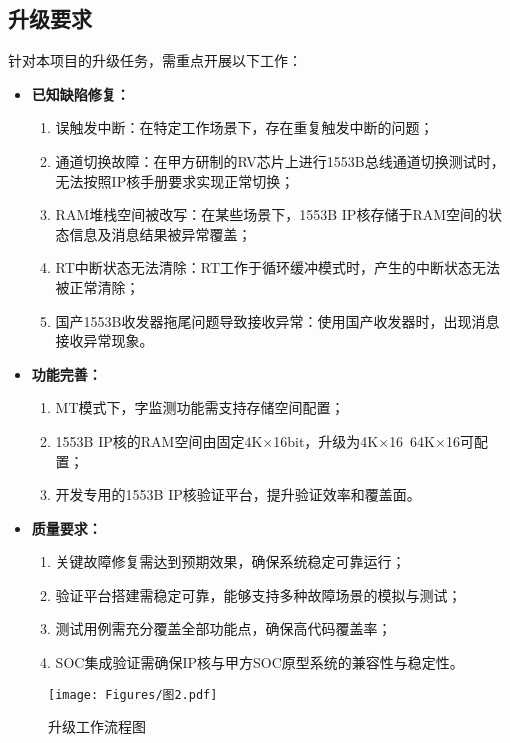 \documentclass[fontset=windows]{article}
\begin{document}
\subsection{升级要求}

针对本项目的升级任务，需重点开展以下工作：

\begin{itemize}
    \item \textbf{已知缺陷修复：}
    \begin{enumerate}[label=(\arabic*)]
        \item 误触发中断：在特定工作场景下，存在重复触发中断的问题；
        \item 通道切换故障：在甲方研制的RV芯片上进行1553B总线通道切换测试时，无法按照IP核手册要求实现正常切换；
        \item RAM堆栈空间被改写：在某些场景下，1553B IP核存储于RAM空间的状态信息及消息结果被异常覆盖；
        \item RT中断状态无法清除：RT工作于循环缓冲模式时，产生的中断状态无法被正常清除；
        \item 国产1553B收发器拖尾问题导致接收异常：使用国产收发器时，出现消息接收异常现象。
    \end{enumerate}
    \item \textbf{功能完善：}
    \begin{enumerate}[label=(\arabic*)]
        \item MT模式下，字监测功能需支持存储空间配置；
        \item 1553B IP核的RAM空间由固定4K$\times$16bit，升级为4K$\times$16~64K$\times$16可配置；
        \item 开发专用的1553B IP核验证平台，提升验证效率和覆盖面。
    \end{enumerate}
    \item \textbf{质量要求：}
    \begin{enumerate}[label=(\arabic*)]
        \item 关键故障修复需达到预期效果，确保系统稳定可靠运行；
        \item 验证平台搭建需稳定可靠，能够支持多种故障场景的模拟与测试；
        \item 测试用例需充分覆盖全部功能点，确保高代码覆盖率；
        \item SOC集成验证需确保IP核与甲方SOC原型系统的兼容性与稳定性。
    \end{enumerate}
\end{itemize}


\begin{figure}[htbp]
	\centering
	\texttt{[image: Figures/图2.pdf]}
	\caption{升级工作流程图}
	\label{fig:platform}
\end{figure}
\end{document}
